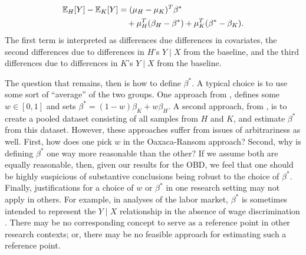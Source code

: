 \begin{align}
  \mathbb{E}_H[Y] - \mathbb{E}_K[Y] &= (\mu_H - \mu_K)^T \beta^* \nonumber \\
  &\quad + \mu_H^T (\beta_H - \beta^*) + \mu_K^T(\beta^* - \beta_K).
\end{align}
The first term is interpreted as differences due differences in covariates, the second differences due to differences in $H$'s $Y \mid X$ from the baseline, and the third differences due to differences in $K$'s $Y \mid X$ from the baseline.

The question that remains, then is how to define $\beta^*$.
A typical choice is to use some sort of ``average'' of the two groups.
One approach from \citet{oaxacaRansom1998}, defines some $w \in [0,1]$ and sets $\beta^* = (1-w)\beta_K + w\beta_H$.
A second approach, from \citet{neumark1988}, is to create a pooled dataset consisting of all samples from $H$ and $K$, and estimate $\beta^*$ from this dataset.
However, these approaches suffer from issues of arbitrariness as well.
First, how does one pick $w$ in the Oaxaca-Ransom approach?
Second, why is defining $\beta^*$ one way more reasonable than the other?
If we assume both are equally reasonable, then, given our results for the OBD, we feel that one should be highly suspicious of substantive conclusions being robust to the choice of $\beta^*$.
Finally, justifications for a choice of $w$ or $\beta^*$ in one research setting may not apply in others.
For example, in analyses of the labor market, $\beta^*$ is sometimes intended to represent the $Y \mid X$ relationship in the absence of wage discrimination \citep{neumark1988}. 
There may be no corresponding concept to serve as a reference point in other research contexts; or, there may be no feasible approach for estimating such a reference point.

